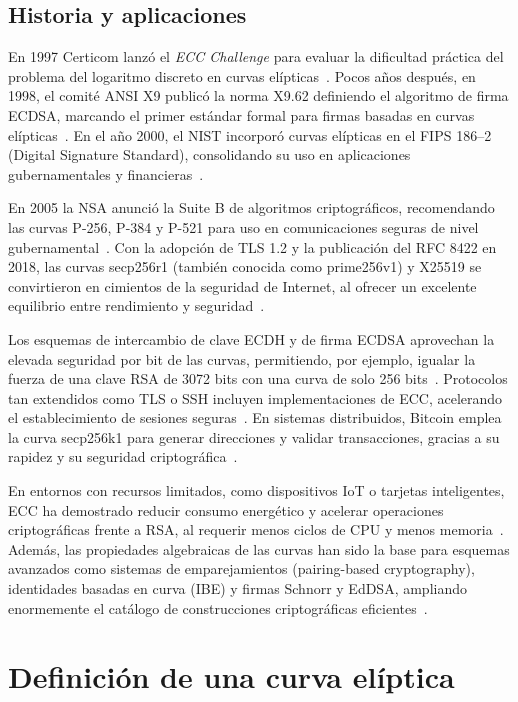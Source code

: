 \subsection{Historia y aplicaciones}\label{sec:historia_curvas_elipticas}
En 1997 Certicom lanzó el \emph{ECC Challenge} para evaluar la dificultad práctica del problema del logaritmo discreto en curvas elípticas~\cite{gaudry2007breaking}. Pocos años después, en 1998, el comité ANSI X9 publicó la norma X9.62 definiendo el algoritmo de firma ECDSA, marcando el primer estándar formal para firmas basadas en curvas elípticas~\cite{ansi_x962_1998}. 
En el año 2000, el NIST incorporó curvas elípticas en el FIPS 186–2 (Digital Signature Standard), consolidando su uso en aplicaciones gubernamentales y financieras~\cite{nist_fips186_2}.

En 2005 la NSA anunció la Suite B de algoritmos criptográficos, recomendando las curvas P-256, P-384 y P-521 para uso en comunicaciones seguras de nivel gubernamental~\cite{rfc5430}. Con la adopción de TLS 1.2 y la publicación del RFC 8422 en 2018, las curvas secp256r1 (también conocida como prime256v1) y X25519 se convirtieron en cimientos de la seguridad de Internet, al ofrecer un excelente equilibrio entre rendimiento y seguridad~\cite{rfc8422}.

Los esquemas de intercambio de clave ECDH y de firma ECDSA aprovechan la elevada seguridad por bit de las curvas, permitiendo, por ejemplo, igualar la fuerza de una clave RSA de 3072 bits con una curva de solo 256 bits~\cite{hankerson2004guide}.
Protocolos tan extendidos como TLS o SSH incluyen implementaciones de ECC, acelerando el establecimiento de sesiones seguras~\cite{rfc4492,rfc5656}. En sistemas distribuidos, Bitcoin emplea la curva secp256k1 para generar direcciones y validar transacciones, gracias a su rapidez y su seguridad criptográfica~\cite{wuille2017secp256k1}.

En entornos con recursos limitados, como dispositivos IoT o tarjetas inteligentes, ECC ha demostrado reducir consumo energético y acelerar operaciones criptográficas frente a RSA, al requerir menos ciclos de CPU y menos memoria~\cite{hodges2001implementing}. Además, las propiedades algebraicas de las curvas han sido la base para esquemas avanzados como sistemas de emparejamientos (pairing-based cryptography), identidades basadas en curva (IBE) y firmas Schnorr y EdDSA, ampliando enormemente el catálogo de construcciones criptográficas eficientes~\cite{boneh2001identity}.

\section{Definición de una curva elíptica}\label{sec:definicion_curvas_elipticas}

